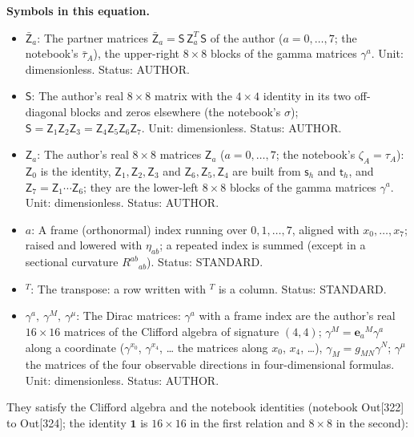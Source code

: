 \documentclass[
  10pt,
]{article}
\providecommand{\tightlist}{%
  \setlength{\itemsep}{0pt}\setlength{\parskip}{0pt}}
\begin{document}
\textbf{Symbols in this equation.}

\begin{itemize}
\tightlist
\item
  \(\bar{\mathsf{Z}}_a\): The partner matrices
  \(\bar{\mathsf{Z}}_a = \mathsf{S}\,\mathsf{Z}_a^T\,\mathsf{S}\) of the
  author (\(a = 0, \dots, 7\); the notebook's \(\bar\tau_A\)), the
  upper-right \(8\times8\) blocks of the gamma matrices \(\gamma^a\).
  Unit: dimensionless. Status: AUTHOR.
\item
  \(\mathsf{S}\): The author's real \(8\times8\) matrix with the
  \(4\times4\) identity in its two off-diagonal blocks and zeros
  elsewhere (the notebook's \(\sigma\));
  \(\mathsf{S} = \mathsf{Z}_1\mathsf{Z}_2\mathsf{Z}_3 = \mathsf{Z}_4\mathsf{Z}_5\mathsf{Z}_6\mathsf{Z}_7\).
  Unit: dimensionless. Status: AUTHOR.
\item
  \(\mathsf{Z}_a\): The author's real \(8\times8\) matrices
  \(\mathsf{Z}_a\) (\(a = 0, \dots, 7\); the notebook's
  \(\zeta_A = \tau_A\)): \(\mathsf{Z}_0\) is the identity,
  \(\mathsf{Z}_1, \mathsf{Z}_2, \mathsf{Z}_3\) and
  \(\mathsf{Z}_6, \mathsf{Z}_5, \mathsf{Z}_4\) are built from
  \(\mathsf{s}_h\) and \(\mathsf{t}_h\), and
  \(\mathsf{Z}_7 = \mathsf{Z}_1\cdots\mathsf{Z}_6\); they are the
  lower-left \(8\times8\) blocks of the gamma matrices \(\gamma^a\).
  Unit: dimensionless. Status: AUTHOR.
\item
  \(a\): A frame (orthonormal) index running over \(0, 1, \dots, 7\),
  aligned with \(x_0, \dots, x_7\); raised and lowered with
  \(\eta_{ab}\); a repeated index is summed (except in a sectional
  curvature \(R^{ab}{}_{ab}\)). Status: STANDARD.
\item
  \({}^T\): The transpose: a row written with \(^T\) is a column.
  Status: STANDARD.
\item
  \(\gamma^a,\ \gamma^M,\ \gamma^\mu\): The Dirac matrices: \(\gamma^a\)
  with a frame index are the author's real \(16 \times 16\) matrices of
  the Clifford algebra of signature \((4, 4)\);
  \(\gamma^M = \mathbf{e}_a{}^M\gamma^a\) along a coordinate
  (\(\gamma^{x_0}\), \(\gamma^{x_4}\), \ldots{} the matrices along
  \(x_0\), \(x_4\), \ldots), \(\gamma_M = g_{MN}\gamma^N\);
  \(\gamma^\mu\) the matrices of the four observable directions in
  four-dimensional formulas. Unit: dimensionless. Status: AUTHOR.
\end{itemize}

They satisfy the Clifford algebra and the notebook identities (notebook
Out{[}322{]} to Out{[}324{]}; the identity \(\mathbf{1}\) is
\(16\times16\) in the first relation and \(8\times8\) in the second):
\end{document}
